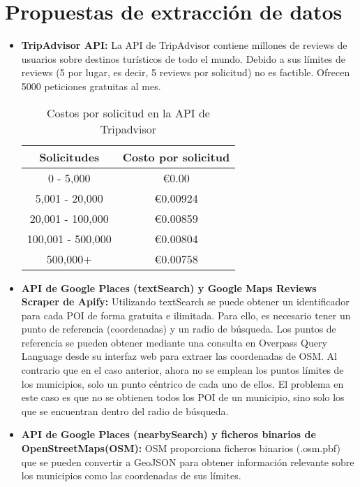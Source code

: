 
\section{Propuestas de extracción de datos}
\begin{itemize}
    \item \textbf{TripAdvisor API:} La API de TripAdvisor contiene millones de reviews de usuarios sobre destinos turísticos de todo el mundo. Debido a sus límites de reviews (5 por lugar, es decir, 5 reviews por solicitud) no es factible.
    Ofrecen 5000 peticiones gratuitas al mes. 
    \begin{table}[h!]
        \centering
        \begin{tabular}{|c|c|}
            \hline
            \textbf{Solicitudes} & \textbf{Costo por solicitud} \\
            \hline
            0 - 5,000 & €0.00 \\
            5,001 - 20,000 & €0.00924 \\
            20,001 - 100,000 & €0.00859 \\
            100,001 - 500,000 & €0.00804 \\
            500,000+ & €0.00758 \\
            \hline
        \end{tabular}
        \caption{Costos por solicitud en la API de Tripadvisor}
    \end{table}
    \item \textbf{API de Google Places (textSearch) y Google Maps Reviews Scraper de Apify:} Utilizando textSearch se puede obtener un identificador para cada POI de forma gratuita e ilimitada. Para ello, es necesario tener un punto de referencia (coordenadas) y un radio de búsqueda.  
    Los puntos de referencia se pueden obtener mediante una consulta en Overpass Query Language desde su interfaz web para extraer las coordenadas de OSM. Al contrario que en el caso anterior, ahora no se emplean los puntos límites de los municipios, solo un punto céntrico de cada uno de ellos.
    El problema en este caso es que no se obtienen todos los POI de un municipio, sino solo los que se encuentran dentro del radio de búsqueda.
    \item \textbf{API de Google Places (nearbySearch) y ficheros binarios de OpenStreetMaps(OSM):} OSM proporciona ficheros binarios (.osm.pbf) que se pueden convertir a GeoJSON para obtener información relevante sobre los municipios como las coordenadas de sus límites. 

\end{itemize}

